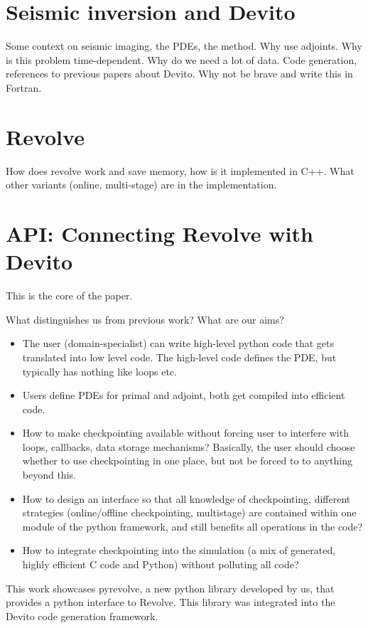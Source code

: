 \documentclass[sigconf]{acmart}
\begin{document}
\section{Seismic inversion and Devito}
\label{sec:inversion_devito}
Some context on seismic imaging, the PDEs, the method. Why use
adjoints. Why is this problem time-dependent. Why do we need a lot of
data.
Code generation, references to previous papers about Devito. Why not
be brave and write this in Fortran.

\section{Revolve}
\label{sec:revolve}
How does revolve work and save memory, how is it implemented in C++. What other variants (online, multi-stage) are in the implementation.

\section{API: Connecting Revolve with Devito}
\label{sec:api}
This is the core of the paper.

What distinguishes us from previous work? What are our aims?
\begin{itemize}
\item The user (domain-specialist) can write high-level python code that gets translated into low
level code. The high-level code defines the PDE, but typically has nothing like loops etc.
\item Users define PDEs for primal and adjoint, both get compiled into efficient code.
\item How to make checkpointing available without forcing user to interfere with loops, callbacks,
data storage mechanisms? Basically, the user should choose whether to use checkpointing in one
place, but not be forced to to anything beyond this.
\item How to design an interface so that all knowledge of checkpointing, different strategies
(online/offline checkpointing, multistage) are contained within one module of the python framework,
and still benefits all operations in the code?
\item How to integrate checkpointing into the simulation (a mix of generated, highly efficient C
code and Python) without polluting all code?
\end{itemize}

This work showcases pyrevolve, a new python library developed by us, that provides a python
interface to Revolve. This library was integrated into the Devito code generation framework.
\end{document}
